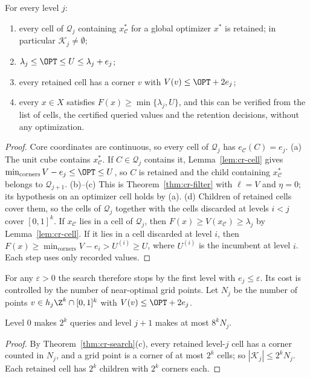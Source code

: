 \begin{theorem}\label{thm:cr-search}
For every level $j$:
\begin{enumerate}
\item[(a)] every cell of $\mathcal Q_j$ containing $x^*_{\mathcal C}$ for a
global optimizer $x^*$ is retained; in particular $\mathcal K_j\ne\emptyset$;
\item[(b)] $\lambda_j\le\OPT\le U\le\lambda_j+e_j$;
\item[(c)] every retained cell has a corner $v$ with $V(v)\le\OPT+2e_j$;
\item[(d)] every $x\in X$ satisfies $F(x)\ge\min\{\lambda_j,U\}$, and this
can be verified from the list of cells, the certified queried values and
the retention decisions, without any optimization.
\end{enumerate}
\end{theorem}
\begin{proof}
Core coordinates are continuous, so every cell of $\mathcal Q_j$ has
$e_{\mathcal C}(C)=e_j$. (a) The unit cube contains $x^*_{\mathcal C}$. If
$C\in\mathcal Q_j$ contains it, Lemma~\ref{lem:cr-cell} gives
$\min_{\text{corners}}V-e_j\le\OPT\le U$, so $C$ is retained and the child
containing $x^*_{\mathcal C}$ belongs to $\mathcal Q_{j+1}$.
(b)--(c) This is Theorem~\ref{thm:cr-filter} with $\ell=V$ and $\eta=0$;
its hypothesis on an optimizer cell holds by (a).
(d) Children of retained cells cover them, so the cells of $\mathcal Q_j$
together with the cells discarded at levels $i<j$ cover $[0,1]^k$. If
$x_{\mathcal C}$ lies in a cell of $\mathcal Q_j$, then
$F(x)\ge V(x_{\mathcal C})\ge\lambda_j$ by Lemma~\ref{lem:cr-cell}. If it lies in
a cell discarded at level $i$, then
$F(x)\ge\min_{\text{corners}}V-e_i>U^{(i)}\ge U$, where $U^{(i)}$ is the
incumbent at level $i$. Each step uses only recorded values.
\end{proof}

For any $\varepsilon>0$ the search therefore stops by the first level with
$e_j\le\varepsilon$. Its cost is controlled by the number of near-optimal
grid points. Let $N_j$ be the number of points
$v\in h_j\Z^k\cap[0,1]^k$ with $V(v)\le\OPT+2e_j$.

\begin{lemma}\label{lem:cr-charge}
Level $0$ makes $2^k$ queries and level $j+1$ makes at most $8^kN_j$.
\end{lemma}
\begin{proof}
By Theorem~\ref{thm:cr-search}(c), every retained level-$j$ cell has a
corner counted in $N_j$, and a grid point is a corner of at most $2^k$
cells; so $|\mathcal K_j|\le2^kN_j$. Each retained cell has $2^k$
children with $2^k$ corners each.
\end{proof}

